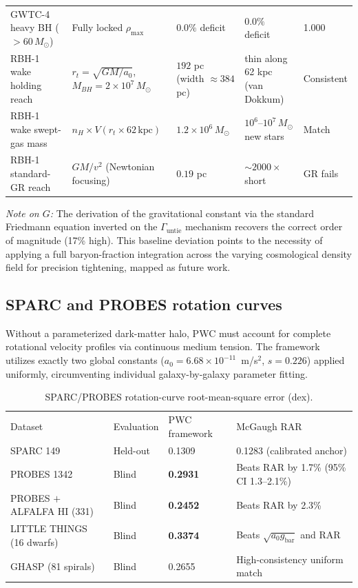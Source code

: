 \documentclass[aps,prd,twocolumn,superscriptaddress,amsmath,amssymb,nofootinbib,floatfix]{revtex4-2}
\newcommand{\Msun}{M_{\odot}}
\newcommand{\rhomax}{\rho_{\max}}
\begin{document}
\begin{table}[t]
\begin{ruledtabular}
\begin{tabular}{lllll}
GWTC-4 heavy BH ($>60\,\Msun$) & Fully locked $\rhomax$ & $0.0\%$ deficit & $0.0\%$ deficit & 1.000 \\
RBH-1 wake holding reach & $r_t = \sqrt{GM/a_0}$, $M_{BH} = 2 \times 10^{7}\,\Msun$ & $192$ pc (width $\approx 384$ pc) & thin along 62 kpc (van Dokkum) & Consistent \\
RBH-1 wake swept-gas mass & $n_H \times V(r_t \times 62\,\text{kpc})$ & $1.2 \times 10^{6}\,\Msun$ & $10^{6}$--$10^{7}\,\Msun$ new stars & Match \\
RBH-1 standard-GR reach & $GM/v^2$ (Newtonian focusing) & $0.19$ pc & $\sim 2000\times$ short & GR fails \\
\end{tabular}
\end{ruledtabular}
\end{table}

\emph{Note on $G$:} The derivation of the gravitational constant via the standard Friedmann equation inverted on the $\Gamma_{\text{untie}}$ mechanism recovers the correct order of magnitude (17\% high). This baseline deviation points to the necessity of applying a full baryon-fraction integration across the varying cosmological density field for precision tightening, mapped as future work.

\subsection{SPARC and PROBES rotation curves}
\label{ssec:sparc}

Without a parameterized dark-matter halo, PWC must account for complete rotational velocity profiles via continuous medium tension. The framework utilizes exactly two global constants ($a_0 = 6.68 \times 10^{-11}$~m/s$^2$, $s = 0.226$) applied uniformly, circumventing individual galaxy-by-galaxy parameter fitting.

\begin{table}[t]
\centering
\caption{SPARC/PROBES rotation-curve root-mean-square error (dex).}
\label{tab:rotation}
\begin{ruledtabular}
\begin{tabular}{llll}
Dataset & Evaluation & PWC framework & McGaugh RAR \\
\colrule
SPARC 149 & Held-out & 0.1309 & 0.1283 (calibrated anchor) \\
PROBES 1342 & Blind & \textbf{0.2931} & Beats RAR by 1.7\% (95\% CI 1.3--2.1\%) \\
PROBES $+$ ALFALFA HI (331) & Blind & \textbf{0.2452} & Beats RAR by 2.3\% \\
LITTLE THINGS (16 dwarfs) & Blind & \textbf{0.3374} & Beats $\sqrt{a_0 g_{\text{bar}}}$ and RAR \\
GHASP (81 spirals) & Blind & 0.2655 & High-consistency uniform match \\
\end{tabular}
\end{ruledtabular}
\end{table}
\end{document}
